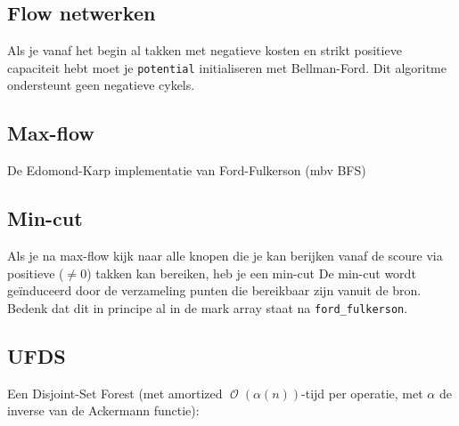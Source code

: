\documentclass[10pt,a4paper,titlepage]{article}
\DeclareMathOperator{\bigO}{\mathcal{O}}
\begin{document}
\subsection{Flow netwerken}


 
 Als je vanaf het begin al takken met negatieve kosten en strikt positieve capaciteit hebt moet je \texttt{potential} initialiseren met Bellman-Ford. Dit algoritme ondersteunt geen negatieve cykels.
 
\subsection{Max-flow}
De Edomond-Karp implementatie van Ford-Fulkerson (mbv BFS)

\subsection{Min-cut}
Als je na max-flow kijk naar alle knopen die je kan berijken vanaf de scoure via positieve ($\not=0$) takken kan bereiken, heb je een min-cut
De min-cut wordt ge\"{i}nduceerd door de verzameling punten die bereikbaar zijn vanuit de bron. Bedenk dat dit in principe al in de mark array staat na \texttt{ford\_fulkerson}.

\subsection{UFDS}
Een Disjoint-Set Forest (met amortized $\bigO(\alpha(n))$-tijd per operatie, met $\alpha$ de inverse van de Ackermann functie):


\iffalse
\end{document}

